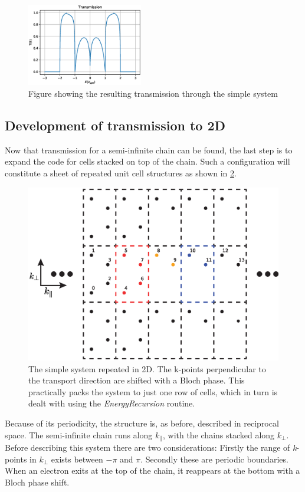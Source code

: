 \begin{figure}[ht]
	\includegraphics[width=0.45\textwidth]{Figures/BetaTE.eps}
	\caption{Figure showing the resulting transmission through the simple system}\label{Transsimple}
\end{figure}
\subsection{Development of transmission to 2D}\label{trans2d}
Now that transmission for a semi-infinite chain can be found, the last step is to expand the code for cells stacked on top of the chain. Such a configuration will constitute a sheet of repeated unit cell structures as shown in \cref{2DTranssys}.
\begin{figure}[ht]
	\centering
	\includegraphics[width=.7\textwidth]{Figures/2DTrans.eps}
	\caption{The simple system repeated in 2D. The k-points perpendicular to the transport direction are shifted with a Bloch phase. This practically packs the system to just one row of cells, which in turn is dealt with using the \textit{EnergyRecursion} routine.}
	\label{2DTranssys}
\end{figure}
Because of its periodicity, the structure is, as before, described in reciprocal space. The semi-infinite chain runs along \(k_{\|}\), with the chains stacked along \(k_{\perp}\).
Before describing this system there are two considerations: Firstly the range of \textit{k}-points in \(k_{\perp}\) exists between \(-\pi\) and \(\pi\). Secondly these are periodic boundaries. When an electron exits at the top of the chain, it reappears at the bottom with a Bloch phase shift.

